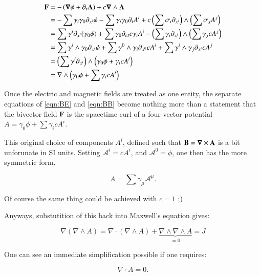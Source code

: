 \documentclass{article}
\newcommand{\spacegrad}[0]{\boldsymbol{\nabla}}
\newcommand{\grad}[0]{\nabla}
\newcommand{\CA}[0]{\mathcal{A}}
\begin{document}
\begin{align*}
\BF 
&= - \left( \spacegrad \phi + \partial_t \BA \right) + c \spacegrad \wedge \BA \\
&= - \sum \gamma_i \gamma_0 \partial_{x^i}\phi - \sum \gamma_i \gamma_0 \partial_t A^i 
+ c \left(\sum \sigma_i \partial_{x^i}\right) \wedge \left(\sum \sigma_j A^j\right) \\
&= \sum \gamma^i \partial_{x^i} (\gamma_0 \phi) + \sum \gamma_0 \partial_{ct} c \gamma_i A^i 
- \left(\sum \gamma_i \partial_{x^i}\right) \wedge \left(\sum \gamma_j c A^j\right) \\
&= \sum \gamma^i \wedge \gamma_0 \partial_{x^i} \phi + \sum \gamma^0 \wedge \gamma_i \partial_{x^0} c A^i 
+ \sum \gamma^i \wedge \gamma_j \partial_{x^i} c A^j \\
&= \left(\sum \gamma^i \partial_{x^i}\right) \wedge \left(\gamma_0 \phi + \gamma_i c A^i \right) \\
&= \grad \wedge \left(\gamma_0 \phi + \sum \gamma_i c A^i \right)
\end{align*}

Once the electric and magnetic fields are treated as one entity, the separate equations of 
\ref{eqn:BE} and \ref{eqn:BB} become nothing more than a statement that the bivector field $\mathbf{F}$ is the spacetime curl
of a four vector potential $A = \gamma_0 \phi + \sum \gamma_i c A^i$.

This original choice of components $A^i$, defined such that $\BB = \spacegrad \cross \BA$ is a bit unforunate in SI
units.  Setting $\CA^i = cA^i$, and $\CA^0 = \phi$, one then has the more symmetric form.

\begin{equation*}
A = \sum \gamma_{\mu} \CA^{\mu}.
\end{equation*}

Of course the same thing could be achieved with $c=1$ ;)

Anyways, substutition of this back into Maxwell's equation gives:

\begin{equation*}
\grad (\grad \wedge A) = \grad \cdot (\grad \wedge A) + \underbrace{\grad \wedge \grad \wedge A}_{=0} = J
\end{equation*}

One can see an immediate simplification possible if one requires:

\begin{equation*}
\grad \cdot A = 0.
\end{equation*}
\end{document}
